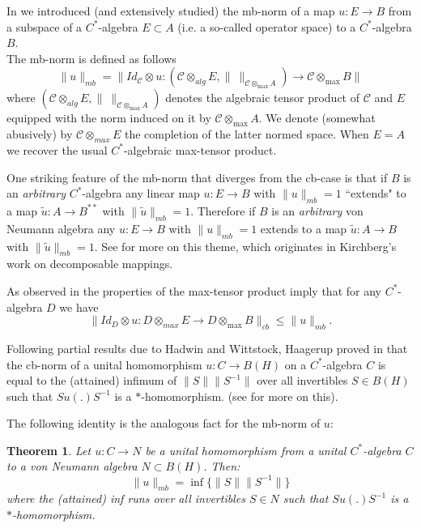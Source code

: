 \documentclass[11pt,leqno]{article}
\newcommand{\cl}[1]{\mathcal{#1}}
\theoremstyle{plain}
\newtheorem{thm}{Theorem}[section]
\theoremstyle{definition}
\theoremstyle{remark}
\numberwithin{equation}{section}
\def\tilde{\widetilde}
\renewcommand{\tilde}{\widetilde}
\def\C{\cl C}
\def\C{\mathscr{C}}
\begin{document}
    
   In \cite{157} we  introduced (and extensively studied) the mb-norm of a map
   $u: E \to B$
    from a subspace of a $C^*$-algebra  $E \subset A$ (i.e. a so-called operator space)
   to a $C^*$-algebra $B$.\\
   The mb-norm is defined as follows
   $$\|u\|_{mb} = \| Id_\C \otimes u: (\C \otimes_{alg} E, \|\ \|_{\C \otimes_{\max}  A}   ) \to \C \otimes_{\max} B  \| $$
   where $(\C \otimes_{alg} E, \|\ \|_{\C \otimes_{\max}  A}   )$ denotes the algebraic tensor product
   of $\C$ and $E$ equipped with the norm induced on it by ${\C \otimes_{\max}  A}$.
   We denote (somewhat abusively) by $\C \otimes_{max} E$ the completion of the latter normed space. When $E=A$ we recover the usual 
   $C^*$-algebraic max-tensor product. 
   
   One striking feature
 of the mb-norm that diverges from the cb-case is that if $B$ is an {\it arbitrary}  $C^*$-algebra
 any linear map $u: E \to B$ with   $\|u\|_{mb}=1$ ``extends" to a map
 $\tilde u: A \to B^{**}$  with $\|\tilde u\|_{mb}=1$.
 Therefore if $B$ is an {\it arbitrary}
   von Neumann algebra any  $u: E \to B$ with   $\|u\|_{mb}=1$  extends to a map
 $\tilde u: A \to B$  with $\|\tilde u\|_{mb}=1$. See \cite[\S 6.3]{154} for more on this theme, which originates in Kirchberg's work on decomposable mappings.

   
   As observed in \cite{157} the properties of the max-tensor product imply that for any $C^*$-algebra
    $D$ we have
     \begin{equation}  \label{e10} \| Id_D \otimes u: D \otimes_{max} E  \to D \otimes_{\max} B  \|_{cb} \le   \|u\|_{mb} . \end{equation}
    
    Following partial results due to Hadwin and Wittstock,
     Haagerup proved  in \cite{Ha} that the cb-norm of a unital homomorphism
    $u: C \to B(H)$ on a $C^*$-algebra $C$ is equal to the (attained) infimum of $  \|S\|\|S^{-1}\|$
 over all invertibles $S \in B(H)$ such that $S u(.) S^{-1}$ is   a $*$-homomorphism.
 (see   \cite[Cor. 4.4, p. 79]{95} for more on this).

    
    The following identity is the analogous fact for
    the mb-norm of $u$:
    \begin{thm}\label{t0} Let $u: C \to {  N}$ be a unital homomorphism from a unital $C^*$-algebra $C$ to a von Neumann algebra ${  N}\subset B(H)$.
    Then:
    $$\|u\|_{mb} =\inf\{\|S\|\| S^{-1}  \| \}$$
    where the (attained) inf runs over all invertibles $S \in {  N}$
    such that $S u(.) S^{-1}$ is   a $*$-homomorphism.
    \end{thm}
    
\end{document}
